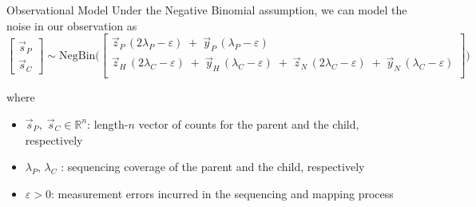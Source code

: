 \documentclass[10pt, t]{beamer}
\begin{document}
\begin{frame}{Observational Model}
	Under the Negative Binomial assumption, we can model the noise in our observation as \vspace{2em}
	\begin{equation*}
		\begin{bmatrix}
			\vec{s}_P \\
			\vec{s}_C
		\end{bmatrix}
		\sim \text{NegBin}
		\Bigg( \begin{bmatrix}
			\vec{z}_P \,(2 \lambda_P - \varepsilon)\; +\; \vec{y}_P \,(\lambda_P - \varepsilon) \\
			\vec{z}_H \,(2 \lambda_C - \varepsilon)\; +\; \vec{y}_H \,(\lambda_C - \varepsilon) \;+ \; \vec{z}_N \,(2 \lambda_C - \varepsilon) \;+ \;\vec{y}_N \,(\lambda_C - \varepsilon) \\
		\end{bmatrix} \Bigg)
	\end{equation*}
\vspace{2em}

where \smallskip
\begin{itemize}
	\item $\vec{s}_P, \; \vec{s}_C \in \mathbb{R}^n$: length-$n$ vector of counts for the parent and the child, respectively
	\item $\lambda_P, \, \lambda_C$ : sequencing coverage of the parent and the child, respectively
	\item $\varepsilon >0$: measurement errors incurred in the sequencing and mapping process
	
\end{itemize}
\end{frame}
\end{document}
